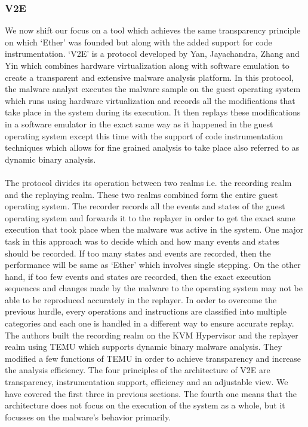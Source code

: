\documentclass[11pt]{article}
\begin{document}
	\subsubsection{V2E}
	We now shift our focus on a tool which achieves the same transparency principle on which ‘Ether’ was founded but along with the added support for code instrumentation. ‘V2E’ is a protocol developed by Yan, Jayachandra, Zhang and Yin which combines hardware virtualization along with software emulation to create a transparent and extensive malware analysis platform. In this protocol, the malware analyst executes the malware sample on the guest operating system which runs using hardware virtualization and records all the modifications that take place in the system during its execution. It then replays these modifications in a software emulator in the exact same way as it happened in the guest operating system except this time with the support of code instrumentation techniques which allows for fine grained analysis to take place also referred to as dynamic binary analysis.\\ \\
	The protocol divides its operation between two realms i.e. the recording realm and the replaying realm. These two realms combined form the entire guest operating system. The recorder records all the events and states of the guest operating system and forwards it to the replayer in order to get the exact same execution that took place when the malware was active in the system. One major task in this approach was to decide which and how many events and states should be recorded. If too many states and events are recorded, then the performance will be same as ‘Ether’ which involves single stepping. On the other hand, if too few events and states are recorded, then the exact execution sequences and changes made by the malware to the operating system may not be able to be reproduced accurately in the replayer. In order to overcome the previous hurdle, every operations and instructions are classified into multiple categories and each one is handled in a different way to ensure accurate replay. The authors built the recording realm on the KVM Hypervisor and the replayer realm using TEMU which supports dynamic binary malware analysis. They modified a few functions of TEMU in order to achieve transparency and increase the analysis efficiency. The four principles of the architecture of V2E are transparency, instrumentation support, efficiency and an adjustable view. We have covered the first three in previous sections. The fourth one means that the architecture does not focus on the execution of the system as a whole, but it focusses on the malware’s behavior primarily.\\ \\
\end{document}
